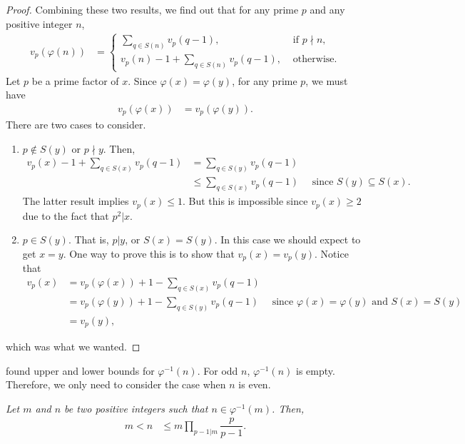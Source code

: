 \documentclass[main.tex]{subfile}
\begin{document}
\begin{proof}
			Combining these two results, we find out that for any prime $p$ and any positive integer $n$,
				\begin{align*}
					v_p(\varphi(n)) & =
						\begin{cases}
							\displaystyle\sum_{q\in S(n)}v_p(q-1),&\text{ if }p\nmid n,\\
							v_p(n)-1+\displaystyle \sum_{q\in S(n)}v_p(q-1),&\text{ otherwise}.
						\end{cases}
				\end{align*}
			Let $p$ be a prime factor of $x$. Since $\varphi(x)=\varphi(y)$, for any prime $p$, we must have
				\begin{align*}
					v_p(\varphi(x)) & = v_p(\varphi(y)).
				\end{align*}
			There are two cases to consider.
				\begin{enumerate}[1.]
					\item $p\notin S(y)$ or $p\nmid y$. Then,
							\begin{align*}
								v_p(x)-1+\sum_{q\in S(x)}v_p(q-1) & = \sum_{q\in S(y)}v_p(q-1)\\
																	  & \leq\sum_{q\in S(x)}v_p(q-1) \quad \text{ since }S(y)\subseteq S(x).
							\end{align*}
						The latter result implies $v_p(x) \leq 1.$ But this is impossible since $v_p(x)\geq2$ due to the fact that $p^2|x$.
					\item $p\in S(y)$. That is, $p|y$, or $S(x)=S(y)$. In this case we should expect to get $x=y$. One way to prove this is to show that $v_p(x)=v_p(y)$. Notice that
						\begin{align*}
							v_p(x) & = v_p(\varphi(x))+1-\sum_{q\in S(x)} v_p(q-1)\\
									 & = v_p(\varphi(y))+1-\sum_{q\in S(y)} v_p(q-1)\quad \text{ since }\varphi(x)=\varphi(y)\text{ and }S(x)=S(y)\\
									 & = v_p(y),
						\end{align*}
				\end{enumerate}
			which was what we wanted.
		\end{proof}

	\textcite{gupta_1981} found upper and lower bounds for $\varphi^{-1}(n)$. For odd $n$, $\varphi^{-1}(n)$ is empty. Therefore, we only need to consider the case when $n$ is even.
		\begin{theorem}[Gupta]\slshape\label{thm:gupta}
			Let $m$ and $n$ be two positive integers such that $n\in\varphi^{-1}(m)$. Then,
				\begin{align*}
					m < n & \leq m\prod_{p-1|m}\dfrac{p}{p-1}.
				\end{align*}
		\end{theorem}
\end{document}
